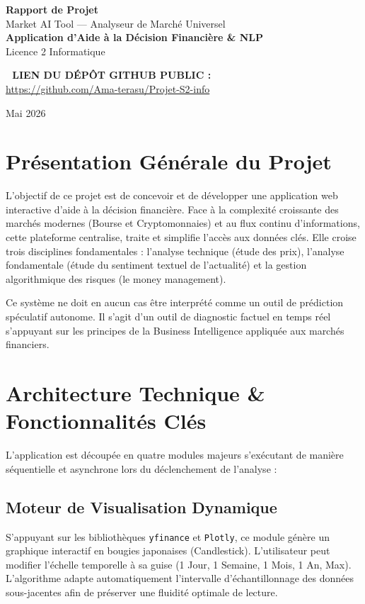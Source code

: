 \documentclass[11pt,a4paper]{article}
\begin{document}
\begin{titlepage}
    \centering
    \vspace*{4cm}
    {\Huge \bfseries Rapport de Projet}\\[0.5cm]
    {\Large Market AI Tool --- Analyseur de Marché Universel}\\[2cm]
    {\large \bfseries Application d'Aide à la Décision Financière \& NLP}\\[1cm]
    {\large Licence 2 Informatique}\\[3cm]
    
    \begin{center}
        \textbf{🔗 LIEN DU DÉPÔT GITHUB PUBLIC :}\\
        \url{https://github.com/Ama-terasu/Projet-S2-info}
    \end{center}
    \vfill
    {\large Mai 2026}
\end{titlepage}

\newpage
\tableofcontents
\newpage

\section{Présentation Générale du Projet}
L'objectif de ce projet est de concevoir et de développer une application web interactive d'aide à la décision financière. Face à la complexité croissante des marchés modernes (Bourse et Cryptomonnaies) et au flux continu d'informations, cette plateforme centralise, traite et simplifie l'accès aux données clés. Elle croise trois disciplines fondamentales : l'analyse technique (étude des prix), l'analyse fondamentale (étude du sentiment textuel de l'actualité) et la gestion algorithmique des risques (le money management).

Ce système ne doit en aucun cas être interprété comme un outil de prédiction spéculatif autonome. Il s'agit d'un outil de diagnostic factuel en temps réel s'appuyant sur les principes de la Business Intelligence appliquée aux marchés financiers.

\section{Architecture Technique \& Fonctionnalités Clés}
L'application est découpée en quatre modules majeurs s'exécutant de manière séquentielle et asynchrone lors du déclenchement de l'analyse :

\subsection{Moteur de Visualisation Dynamique}
S'appuyant sur les bibliothèques \texttt{yfinance} et \texttt{Plotly}, ce module génère un graphique interactif en bougies japonaises (Candlestick). L'utilisateur peut modifier l'échelle temporelle à sa guise (1 Jour, 1 Semaine, 1 Mois, 1 An, Max). L'algorithme adapte automatiquement l'intervalle d'échantillonnage des données sous-jacentes afin de préserver une fluidité optimale de lecture.
\end{document}
